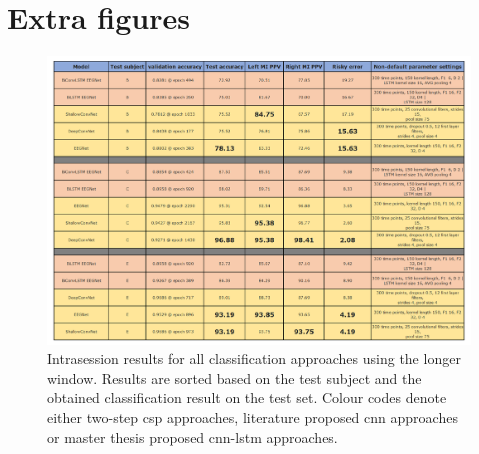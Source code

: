 \chapter*{Extra figures}

\begin{figure}[ht]
    \centering
    \includegraphics[width=\linewidth]{../images/results/results_intrasess_long.pdf}
    \captionsetup{width=\linewidth}
    \captionsetup{justification=centering}
    \caption{Intrasession results for all classification approaches using the longer window. Results are sorted based on the test subject and the obtained classification result on the test set. Colour codes denote either two-step \gls{csp} approaches, literature proposed \gls{cnn} approaches or master thesis proposed \gls{cnn}-\gls{lstm} approaches.} 
    \label{fig:results_intrasession_long}
\end{figure}

